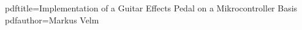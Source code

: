 \newcommand*{\mytitle}{Implementation of a Guitar Effects Pedal on a Mikrocontroller Basis}
\newcommand*{\mysubtitle}{Subtitle}
\newcommand*{\myauthor}{Markus Velm}
\newcommand*{\hochschule}{Hochschule Karlsruhe}
\newcommand*{\fakultaet}{Fakult\"{a}t f\"{u}r Elektro- und Informationstechnik}
\newcommand*{\course}{Electrical- and Information Engineering}
\newcommand*{\semester}{Two}
\newcommand*{\abgabeTermin}{Termin}
\newcommand*{\prof}{Prof. Dr. Manfred Litzenburger}
\newcommand*{\betreuer}{Prof. Dr. Manfred Litzenburger}
\newcommand*{\ort}{Karlsruhe}

\hypersetup
{
	pdftitle=\mytitle
	pdfauthor=\myauthor
}
